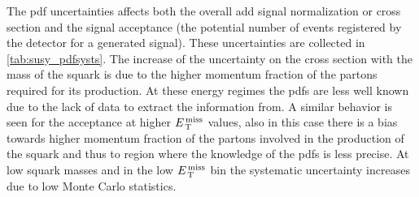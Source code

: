 The \gls{pdf} uncertainties affects both the overall \gls{add} signal
normalization or cross section and the signal acceptance (the potential number
of events registered by the detector for a generated signal). These
uncertainties are collected in \cref{tab:susy_pdfsysts}. The increase of the
uncertainty on the cross section with the mass of the squark is due to the
higher momentum fraction of the partons required for its production. At these
energy regimes the \glspl{pdf} are less well known due to the lack of data to
extract the information from. A similar behavior is seen for the acceptance at
higher $\met$ values, also in this case there is a bias towards higher momentum
fraction of the partons involved in the production of the squark and thus to
region where the knowledge of the \glspl{pdf} is less precise. At low squark
masses and in the low $\met$ bin the systematic uncertainty increases due to low
Monte Carlo statistics.
\begin{table}
\centering
\small
{}
\caption{\gls{pdf} systematic uncertainties in \% on the SUSY compressed
  models. The uncertainty is the envelop that contains the signal yields from
  the three \gls{pdf} families, and their error bands. The first row indicates
  the systematic uncertainty on the overall normalisation. The following rows
  show uncertainty on the acceptance in the signal region $\met$ bins.}
\label{tab:susy_pdfsysts}
\end{table}
